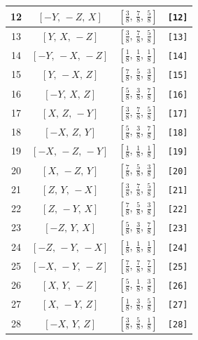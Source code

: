 \documentclass[fleqn,8pt]{jsarticle}
\begin{document}
\begin{longtable}{cccc}
12 & $\left[ - Y,\, - Z,\, X \right]$ & $\left[ \frac{3}{8},\, \frac{7}{8},\, \frac{5}{8} \right]$ & {\tt [12]} \\ \hline
13 & $\left[ Y,\, X,\, - Z \right]$ & $\left[ \frac{3}{8},\, \frac{7}{8},\, \frac{5}{8} \right]$ & {\tt [13]} \\ \hline
14 & $\left[ - Y,\, - X,\, - Z \right]$ & $\left[ \frac{1}{8},\, \frac{1}{8},\, \frac{1}{8} \right]$ & {\tt [14]} \\ \hline
15 & $\left[ Y,\, - X,\, Z \right]$ & $\left[ \frac{7}{8},\, \frac{5}{8},\, \frac{3}{8} \right]$ & {\tt [15]} \\ \hline
16 & $\left[ - Y,\, X,\, Z \right]$ & $\left[ \frac{5}{8},\, \frac{3}{8},\, \frac{7}{8} \right]$ & {\tt [16]} \\ \hline
17 & $\left[ X,\, Z,\, - Y \right]$ & $\left[ \frac{3}{8},\, \frac{7}{8},\, \frac{5}{8} \right]$ & {\tt [17]} \\ \hline
18 & $\left[ - X,\, Z,\, Y \right]$ & $\left[ \frac{5}{8},\, \frac{3}{8},\, \frac{7}{8} \right]$ & {\tt [18]} \\ \hline
19 & $\left[ - X,\, - Z,\, - Y \right]$ & $\left[ \frac{1}{8},\, \frac{1}{8},\, \frac{1}{8} \right]$ & {\tt [19]} \\ \hline
20 & $\left[ X,\, - Z,\, Y \right]$ & $\left[ \frac{7}{8},\, \frac{5}{8},\, \frac{3}{8} \right]$ & {\tt [20]} \\ \hline
21 & $\left[ Z,\, Y,\, - X \right]$ & $\left[ \frac{3}{8},\, \frac{7}{8},\, \frac{5}{8} \right]$ & {\tt [21]} \\ \hline
22 & $\left[ Z,\, - Y,\, X \right]$ & $\left[ \frac{7}{8},\, \frac{5}{8},\, \frac{3}{8} \right]$ & {\tt [22]} \\ \hline
23 & $\left[ - Z,\, Y,\, X \right]$ & $\left[ \frac{5}{8},\, \frac{3}{8},\, \frac{7}{8} \right]$ & {\tt [23]} \\ \hline
24 & $\left[ - Z,\, - Y,\, - X \right]$ & $\left[ \frac{1}{8},\, \frac{1}{8},\, \frac{1}{8} \right]$ & {\tt [24]} \\ \hline
25 & $\left[ - X,\, - Y,\, - Z \right]$ & $\left[ \frac{7}{8},\, \frac{7}{8},\, \frac{7}{8} \right]$ & {\tt [25]} \\ \hline
26 & $\left[ X,\, Y,\, - Z \right]$ & $\left[ \frac{5}{8},\, \frac{1}{8},\, \frac{3}{8} \right]$ & {\tt [26]} \\ \hline
27 & $\left[ X,\, - Y,\, Z \right]$ & $\left[ \frac{1}{8},\, \frac{3}{8},\, \frac{5}{8} \right]$ & {\tt [27]} \\ \hline
28 & $\left[ - X,\, Y,\, Z \right]$ & $\left[ \frac{3}{8},\, \frac{5}{8},\, \frac{1}{8} \right]$ & {\tt [28]} \\ \hline

\end{longtable}
\end{document}
